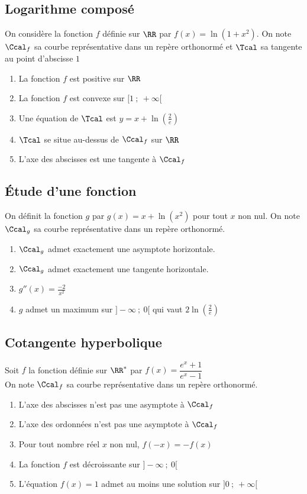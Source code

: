 \documentclass[oneside,12pt]{article}
\begin{document}
\subsection{Logarithme composé}
On considère la fonction $f$ définie sur $\RR$ par $f(x)=\ln(1+x^2)$. On note $\Ccal_f$ sa courbe représentative dans un repère orthonormé et $\Tcal$ sa tangente au point d'abscisse $1$
\begin{enumerate}
	\item La fonction $f$ est positive sur $\RR$
	\item La fonction $f$ est convexe sur $[1~;~+\infty[$
	\item Une équation de $\Tcal$ est $y=x+\ln\left(\frac{2}{e}\right)$
	\item $\Tcal$ se situe au-dessus de $\Ccal_f$ sur $\RR$
	\item L'axe des abscisses est une tangente à $\Ccal_f$
\end{enumerate}



\subsection{Étude d'une fonction}
On définit la fonction $g$ par $g(x)=x+\ln(x^2)$ pour tout $x$ non nul. On note $\Ccal_g$ sa courbe représentative dans un repère orthonormé.
\begin{enumerate}
	\item $\Ccal_g$ admet exactement une asymptote horizontale.
	\item $\Ccal_g$ admet exactement une tangente horizontale.
	\item $g''(x)=\frac{-2}{x^2}$
	\item $g$ admet un maximum sur $]-\infty~;~0[$ qui vaut $2\ln\left(\frac{2}{e}\right)$
\end{enumerate}


\subsection{Cotangente hyperbolique}
Soit $f$ la fonction définie sur $\RR^*$ par $f(x)=\dfrac{e^x+1}{e^x-1}$\\
On note $\Ccal_f$ sa courbe représentative dans un repère orthonormé.
\begin{enumerate}
    \item L'axe des abscisses n'est pas une asymptote à $\Ccal_f$
    \item L'axe des ordonnées n'est pas une asymptote à $\Ccal_f$
    \item Pour tout nombre réel $x$ non nul, $f(-x)=-f(x)$
    \item La fonction $f$ est décroissante sur $]-\infty~;~0[$
    \item L'équation $f(x)=1$ admet au moins une solution sur $]0~;~+\infty[$
\end{enumerate}
\end{document}
